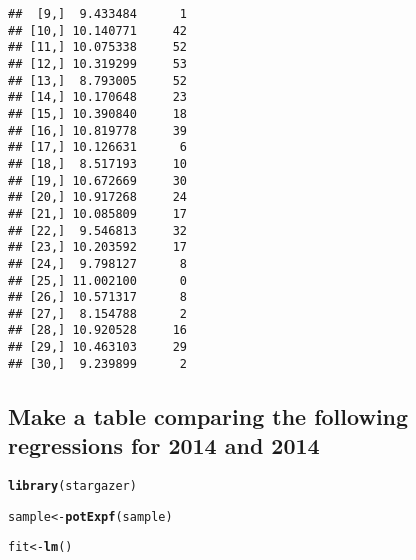 \documentclass{article}\usepackage[]{graphicx}\usepackage[]{color}
\makeatletter
\newcommand{\hlstd}[1]{\textcolor[rgb]{0.345,0.345,0.345}{#1}}%
\newcommand{\hlkwb}[1]{\textcolor[rgb]{0.69,0.353,0.396}{#1}}%
\newcommand{\hlkwd}[1]{\textcolor[rgb]{0.737,0.353,0.396}{\textbf{#1}}}%
\newenvironment{kframe}{%
 \def\at@end@of@kframe{}%
 \ifinner\ifhmode%
  \def\at@end@of@kframe{\end{minipage}}%
  \begin{minipage}{\columnwidth}%
 \fi\fi%
 \def\FrameCommand##1{\hskip\@totalleftmargin \hskip-\fboxsep
 \colorbox{shadecolor}{##1}\hskip-\fboxsep
     \hskip-\linewidth \hskip-\@totalleftmargin \hskip\columnwidth}%
 \MakeFramed {\advance\hsize-\width
   \@totalleftmargin\z@ \linewidth\hsize
   \@setminipage}}%
 {\par\unskip\endMakeFramed%
 \at@end@of@kframe}
\newenvironment{knitrout}{}{} %
\makeatother
\begin{document}
\begin{knitrout}
\begin{kframe}
\begin{verbatim}
##  [9,]  9.433484      1
## [10,] 10.140771     42
## [11,] 10.075338     52
## [12,] 10.319299     53
## [13,]  8.793005     52
## [14,] 10.170648     23
## [15,] 10.390840     18
## [16,] 10.819778     39
## [17,] 10.126631      6
## [18,]  8.517193     10
## [19,] 10.672669     30
## [20,] 10.917268     24
## [21,] 10.085809     17
## [22,]  9.546813     32
## [23,] 10.203592     17
## [24,]  9.798127      8
## [25,] 11.002100      0
## [26,] 10.571317      8
## [27,]  8.154788      2
## [28,] 10.920528     16
## [29,] 10.463103     29
## [30,]  9.239899      2
\end{verbatim}
\end{kframe}
\end{knitrout}

\subsection{Make a table comparing the following regressions for 2014 and 2014}

\begin{knitrout}
\color{fgcolor}\begin{kframe}
\begin{alltt}
\hlkwd{library}\hlstd{(stargazer)}

\hlstd{sample} \hlkwb{<-} \hlkwd{potExpf}\hlstd{(sample)}

\hlstd{fit} \hlkwb{<-} \hlkwd{lm}\hlstd{()}
\end{alltt}


{\ttfamily\noindent\bfseries\color{errorcolor}{\#\# Error in terms.formula(formula, data = data): argument is not a valid model}}\end{kframe}
\end{knitrout}
\end{document}
